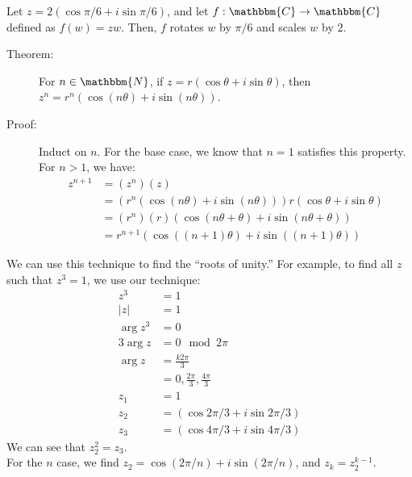 \documentclass[10pt]{extarticle}
\newcommand{\N}{\mathbbm{N}}
\newcommand{\C}{\mathbbm{C}}
\begin{document}
  Let $z = 2(\cos \pi/6 + i\sin\pi/6)$, and let $f: \C \rightarrow \C$ defined as $f(w) = zw$. Then, $f$ rotates $w$ by $\pi/6$ and scales $w$ by $2$.\\

  \begin{description}
    \item[Theorem:] For $n\in \N$, if $z = r(\cos\theta + i\sin\theta)$, then $z^n = r^n(\cos(n\theta) + i\sin(n\theta))$.
    \item[Proof:] Induct on $n$. For the base case, we know that $n=1$ satisfies this property. For $n > 1$, we have:
      \begin{align*}
        z^{n+1} &= (z^n)(z)\\
                &= \left(r^n(\cos(n\theta) + i\sin(n\theta))\right)r(\cos\theta + i\sin\theta)\\
                &= (r^n)(r)\left(\cos(n\theta + \theta) + i\sin(n\theta + \theta)\right) \tag*{Polar Representation Definition}\\
                &= r^{n+1}(\cos\left((n+1)\theta\right) + i\sin((n+1)\theta))
      \end{align*}
  \end{description}
  We can use this technique to find the ``roots of unity.'' For example, to find all $z$ such that $z^3 = 1$, we use our technique:
  \begin{align*}
    z^3 &= 1\\
    |z| &= 1\\
    \arg z^3 &= 0\\
    3\arg z &= 0 \mod 2\pi\\
    \arg z &= \frac{k2\pi}{3}\\
           &= 0,\frac{2\pi}{3},\frac{4\pi}{3}\\
    z_1 &= 1\\
    z_2 &= (\cos 2\pi/3 + i\sin 2\pi/3)\\
    z_3 &= (\cos 4\pi/3 + i\sin 4\pi/3)
  \end{align*}
  We can see that $z_2^2 = z_3$.\\

  For the $n$ case, we find $z_2 = \cos(2\pi/n) + i\sin(2\pi/n)$, and $z_{k} = z_2^{k-1}$.
\end{document}
